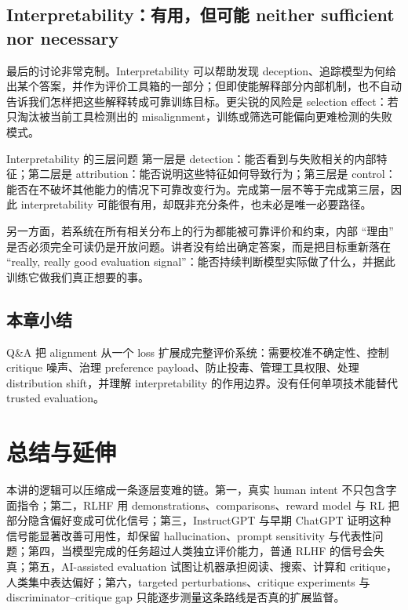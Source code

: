 \documentclass[a4paper]{article}
\begin{document}
\subsection{Interpretability：有用，但可能 neither sufficient nor necessary}

最后的讨论非常克制。Interpretability 可以帮助发现 deception、追踪模型为何给出某个答案，并作为评价工具箱的一部分；但即使能解释部分内部机制，也不自动告诉我们怎样把这些解释转成可靠训练目标。更尖锐的风险是 selection effect：若只淘汰被当前工具检测出的 misalignment，训练或筛选可能偏向更难检测的失败模式。

\begin{importantbox}{Interpretability 的三层问题}
第一层是 detection：能否看到与失败相关的内部特征；第二层是 attribution：能否说明这些特征如何导致行为；第三层是 control：能否在不破坏其他能力的情况下可靠改变行为。完成第一层不等于完成第三层，因此 interpretability 可能很有用，却既非充分条件，也未必是唯一必要路径。
\end{importantbox}

另一方面，若系统在所有相关分布上的行为都能被可靠评价和约束，内部 ``理由'' 是否必须完全可读仍是开放问题。讲者没有给出确定答案，而是把目标重新落在 ``really, really good evaluation signal''：能否持续判断模型实际做了什么，并据此训练它做我们真正想要的事。

\subsection{本章小结}

Q\&A 把 alignment 从一个 loss 扩展成完整评价系统：需要校准不确定性、控制 critique 噪声、治理 preference payload、防止投毒、管理工具权限、处理 distribution shift，并理解 interpretability 的作用边界。没有任何单项技术能替代 trusted evaluation。

\section{总结与延伸}

本讲的逻辑可以压缩成一条逐层变难的链。第一，真实 human intent 不只包含字面指令；第二，RLHF 用 demonstrations、comparisons、reward model 与 RL 把部分隐含偏好变成可优化信号；第三，InstructGPT 与早期 ChatGPT 证明这种信号能显著改善可用性，却保留 hallucination、prompt sensitivity 与代表性问题；第四，当模型完成的任务超过人类独立评价能力，普通 RLHF 的信号会失真；第五，AI-assisted evaluation 试图让机器承担阅读、搜索、计算和 critique，人类集中表达偏好；第六，targeted perturbations、critique experiments 与 discriminator--critique gap 只能逐步测量这条路线是否真的扩展监督。
\end{document}
